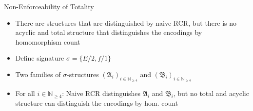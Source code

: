 \documentclass[aspectratio=169]{beamer}
\begin{document}
	\begin{frame}{Non-Enforceability of Totality}
		\begin{itemize}
			\item There are structures that are distinguished by naive RCR, but there is no acyclic and total structure that distinguishes the encodings by homomorphism count
			\item Define signature $\sigma=\{E/2,f/1\}$
			\item Two families of $\sigma$-structures $(\mathfrak A_i)_{i\in\mathbb N_{\geq 4}}$ and $(\mathfrak B_i)_{i\in\mathbb N_{\geq 4}}$
			\item For all $i\in \mathbb N_{\geq 4}$: Naive RCR distinguishes $\mathfrak A_i$ and $\mathfrak B_i$, but no total and acyclic structure can distinguish the encodings by hom. count
		\end{itemize}
	\end{frame}
	
\end{document}

